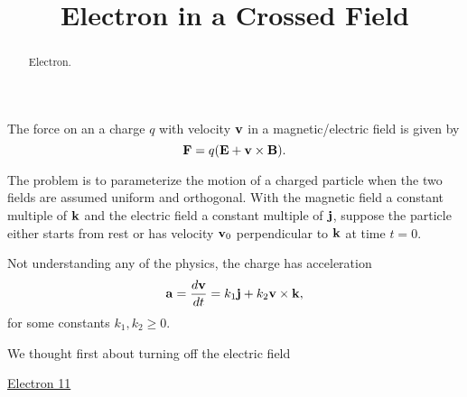 \documentclass{ximera}
\title{Electron in a Crossed Field}
\begin{document}
\begin{abstract}
Electron.
\end{abstract}
\maketitle

The force on an a charge $q$ with velocity ${\bf v}$ in a magnetic/electric field is given by
\[
     {\bf F} = q ({\bf E} + {\bf v}\times {\bf B} ) .
\]

The problem is to parameterize the motion of a charged particle when the two fields are assumed uniform and orthogonal. With the magnetic field a constant multiple of ${\bf k}$ and the electric field a constant multiple of ${\bf j}$, suppose the particle either starts from rest or has velocity ${\bf v}_0$ perpendicular to ${\bf k}$ at time $t=0$.

Not understanding any of the physics, the charge has acceleration
\[
    {\bf a} =  \frac{d {\bf v}}{dt} = k_1 {\bf j} + k_2 {\bf v}\times {\bf k} ,
\]
for some constants $k_1, k_2 \geq 0$.

We thought first about turning off the electric field


\begin{exploration} \label{Edgvb5rthh}

\begin{onlineOnly}
    \begin{center}
\end{center}
\end{onlineOnly}

\href{https://www.desmos.com/calculator/jdgp5obovm}{Electron 11}


\end{exploration}
\end{document}
